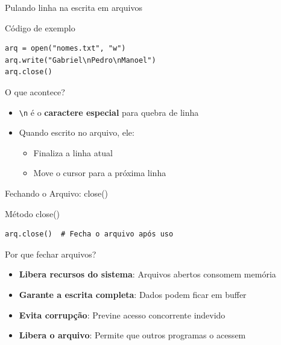 \begin{frame}[fragile]{Pulando linha na escrita em arquivos}

\begin{block}{Código de exemplo}
\begin{verbatim}
arq = open("nomes.txt", "w")
arq.write("Gabriel\nPedro\nManoel")
arq.close()
\end{verbatim}
\end{block}



\begin{alertblock}{O que acontece?}
\begin{itemize}
\item \texttt{\textbackslash n} é o \textbf{caractere especial} para quebra de linha
\item Quando escrito no arquivo, ele:
  \begin{itemize}
  \item Finaliza a linha atual
  \item Move o cursor para a próxima linha
  \end{itemize}

\end{itemize}
\end{alertblock}


\end{frame}

\begin{frame}[fragile]{Fechando o Arquivo: close()}

\begin{block}{Método close()}
\begin{verbatim}
arq.close()  # Fecha o arquivo após uso
\end{verbatim}
\end{block}

\begin{alertblock}{Por que fechar arquivos?}
\begin{itemize}
\item \textbf{Libera recursos do sistema}: Arquivos abertos consomem memória
\item \textbf{Garante a escrita completa}: Dados podem ficar em buffer
\item \textbf{Evita corrupção}: Previne acesso concorrente indevido
\item \textbf{Libera o arquivo}: Permite que outros programas o acessem
\end{itemize}
\end{alertblock}


\end{frame}


